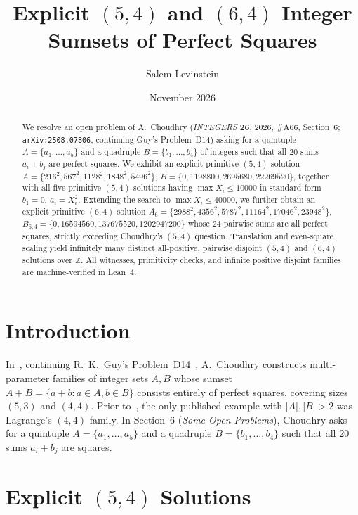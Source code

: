 \documentclass[11pt]{article}
\title{Explicit $(5, 4)$ and $(6, 4)$ Integer Sumsets of Perfect Squares}
\author{Salem Levinstein}
\date{November 2026}
\begin{document}
\maketitle

\begin{abstract}
We resolve an open problem of A.~Choudhry (\emph{INTEGERS} \textbf{26}, 2026, \#A66, Section~6; \texttt{arXiv:2508.07806}, continuing Guy's Problem~D14) asking for a quintuple $A = \{a_1, \dots, a_5\}$ and a quadruple $B = \{b_1, \dots, b_4\}$ of integers such that all $20$ sums $a_i + b_j$ are perfect squares. We exhibit an explicit primitive $(5, 4)$ solution $A = \{216^2, 567^2, 1128^2, 1848^2, 5496^2\}$, $B = \{0, 1198800, 2695680, 22269520\}$, together with all five primitive $(5, 4)$ solutions having $\max X_i \le 10000$ in standard form $b_1 = 0$, $a_i = X_i^2$. Extending the search to $\max X_i \le 40000$, we further obtain an explicit primitive $(6, 4)$ solution $A_6 = \{2988^2, 4356^2, 5787^2, 11164^2, 17046^2, 23948^2\}$, $B_{6,4} = \{0, 16594560, 137675520, 1202947200\}$ whose $24$ pairwise sums are all perfect squares, strictly exceeding Choudhry's $(5, 4)$ question. Translation and even-square scaling yield infinitely many distinct all-positive, pairwise disjoint $(5, 4)$ and $(6, 4)$ solutions over $\mathbb{Z}$. All witnesses, primitivity checks, and infinite positive disjoint families are machine-verified in Lean~4.
\end{abstract}

\section{Introduction}

In~\cite{Choudhry2026}, continuing R.~K.~Guy's Problem~D14~\cite{Guy2004}, A.~Choudhry constructs multi-parameter families of integer sets $A, B$ whose sumset $A + B = \{a + b : a \in A, b \in B\}$ consists entirely of perfect squares, covering sizes $(5, 3)$ and $(4, 4)$. Prior to~\cite{Choudhry2026}, the only published example with $|A|, |B| > 2$ was Lagrange's $(4, 4)$ family. In Section~6 (\emph{Some Open Problems}), Choudhry asks for a quintuple $A = \{a_1, \dots, a_5\}$ and a quadruple $B = \{b_1, \dots, b_4\}$ such that all $20$ sums $a_i + b_j$ are squares.

\section{Explicit \texorpdfstring{$(5, 4)$}{(5, 4)} Solutions}
\end{document}
